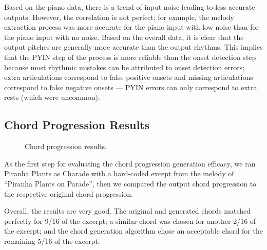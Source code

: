 Based on the piano data, there is a trend of input noise leading to less accurate outputs. However, the correlation is not perfect; for example, the melody extraction process was more accurate for the piano input with low noise than for the piano input with no noise. Based on the overall data, it is clear that the output pitches are generally more accurate than the output rhythms. This implies that the PYIN step of the process is more reliable than the onset detection step because most rhythmic mistakes can be attributed to onset detection errors; extra articulations correspond to false positive onsets and missing articulations correspond to false negative onsets --- PYIN errors can only correspond to extra rests (which were uncommon).

\subsection{Chord Progression Results}
\label{sec:chord_progression_results}

\begin{figure}
    \resizebox{\linewidth}{!}{}
    \caption{Chord progression results.}
    \label{fig:chord_progression_pie}
\end{figure}
As the first step for evaluating the chord progression generation efficacy, we ran Piranha Plants as Charade with a hard-coded except from the melody of ``Piranha Plants on Parade'', then we compared the output chord progression to the respective original chord progression.

Overall, the results are very good. The original and generated chords matched perfectly for 9/16 of the excerpt; a similar chord was chosen for another 2/16 of the excerpt; and the chord generation algorithm chose an acceptable chord for the remaining 5/16 of the excerpt.


